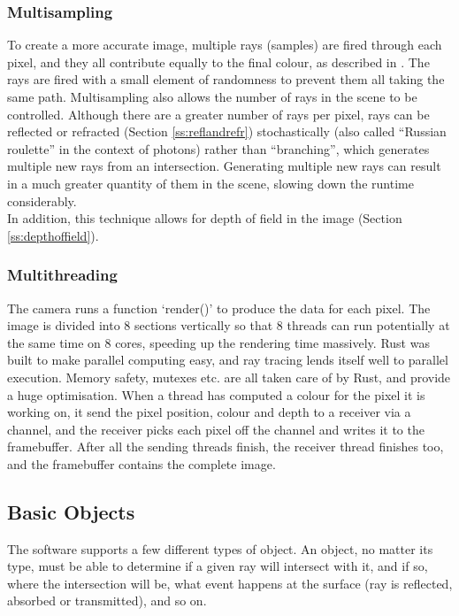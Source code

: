 \documentclass[a4paper]{article}
\begin{document}
\subsubsection{Multisampling} To create a more accurate image, multiple rays (samples) are fired through each pixel, and they all contribute equally to the final colour, as described in \cite{Cook1984multisampling}. The rays are fired with a small element of randomness to prevent them all taking the same path. Multisampling also allows the number of rays in the scene to be controlled. Although there are a greater number of rays per pixel, rays can be reflected or refracted (Section \ref{ss:reflandrefr}) stochastically (also called ``Russian roulette'' in the context of photons) rather than ``branching'', which generates multiple new rays from an intersection. Generating multiple new rays can result in a much greater quantity of them in the scene, slowing down the runtime considerably.\\

In addition, this technique allows for depth of field in the image (Section \ref{ss:depthoffield}).\\

\subsubsection{Multithreading}
The camera runs a function `render()' to produce the data for each pixel. The image is divided into 8 sections vertically so that 8 threads can run potentially at the same time on 8 cores, speeding up the rendering time massively. Rust was built to make parallel computing easy, and ray tracing lends itself well to parallel execution. Memory safety, mutexes etc. are all taken care of by Rust, and provide a huge optimisation. When a thread has computed a colour for the pixel it is working on, it send the pixel position, colour and depth to a receiver via a channel, and the receiver picks each pixel off the channel and writes it to the framebuffer. After all the sending threads finish, the receiver thread finishes too, and the framebuffer contains the complete image.

\subsection{Basic Objects}
The software supports a few different types of object. An object, no matter its type, must be able to determine if a given ray will intersect with it, and if so, where the intersection will be, what event happens at the surface (ray is reflected, absorbed or transmitted), and so on.
\end{document}
